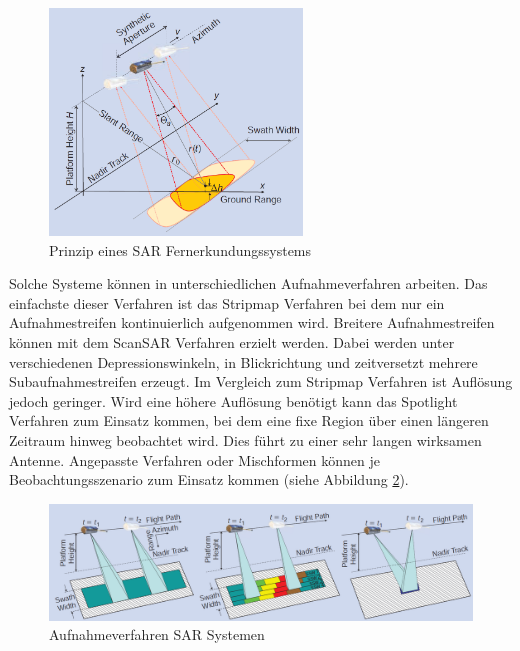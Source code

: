 \begin{figure}[H]
    \centering
    \includegraphics[width=0.6\textwidth]{Bilder/SAR_Prinzip.png}
    \caption{Prinzip eines SAR Fernerkundungssystems \cite{tutorial_on_sar}}
    \label{sar_prinzip}
\end{figure}

Solche Systeme können in unterschiedlichen Aufnahmeverfahren arbeiten. Das einfachste dieser Verfahren ist das Stripmap Verfahren bei dem nur ein Aufnahmestreifen
kontinuierlich aufgenommen wird. Breitere Aufnahmestreifen können mit dem ScanSAR Verfahren erzielt werden. Dabei werden unter verschiedenen Depressionswinkeln, 
in Blickrichtung und zeitversetzt mehrere Subaufnahmestreifen erzeugt. Im Vergleich zum Stripmap Verfahren ist Auflösung jedoch geringer. 
Wird eine höhere Auflösung benötigt kann das Spotlight Verfahren zum Einsatz kommen, bei dem eine fixe Region über einen längeren Zeitraum hinweg beobachtet wird. Dies führt zu 
einer sehr langen wirksamen Antenne. Angepasste Verfahren oder Mischformen können je Beobachtungsszenario zum Einsatz kommen (siehe Abbildung \ref{sar_scan_modi})\cite{tutorial_on_sar}. 

\begin{figure}[H]
    \centering
    \includegraphics[width=\textwidth]{Bilder/SAR_Modi.png}
    \caption{Aufnahmeverfahren SAR Systemen \cite{tutorial_on_sar}}
    \label{sar_scan_modi}
\end{figure}


